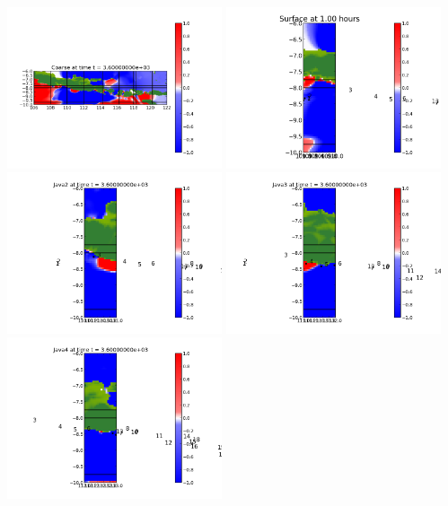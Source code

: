 \documentclass[11pt]{article}
\begin{document}
\vskip 10pt 
\includegraphics[width=0.475\textwidth]{frame0004fig0.png}
\includegraphics[width=0.475\textwidth]{frame0004fig15.png}
\vskip 10pt 
\includegraphics[width=0.475\textwidth]{frame0004fig25.png}
\includegraphics[width=0.475\textwidth]{frame0004fig20.png}
\vskip 10pt 
\includegraphics[width=0.475\textwidth]{frame0004fig30.png}
\end{document}

